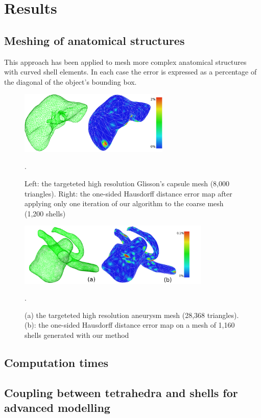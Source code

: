 \documentclass{llncs}
\begin{document}
\section{Results}
\label{sec:results}
\subsection{Meshing of anatomical structures}

This approach has been applied to mesh more complex anatomical structures with curved shell elements. In each case the error is expressed as a percentage of the diagonal of the object's bounding box. 

\begin{figure}
\centering
\includegraphics[height=3cm]{images/resultsLiver}
\caption {Left: the targeteted high resolution Glisson's capsule mesh (8,000 triangles). Right: the one-sided Hausdorff distance error map after applying only one iteration of our algorithm to the coarse mesh (1,200 shells)}. 
\label{fig-liver}
\end{figure}

\begin{figure}
\centering
\includegraphics[height=3cm]{images/resultsAneurysm}
\caption {(a) the targeteted high resolution aneurysm mesh (28,368 triangles). (b): the one-sided Hausdorff distance error map on a mesh of 1,160 shells generated with our method}.
\label{fig-aneurysm}
\end{figure}


\subsection{Computation times}


\subsection{Coupling between tetrahedra and shells for advanced modelling}
\end{document}
